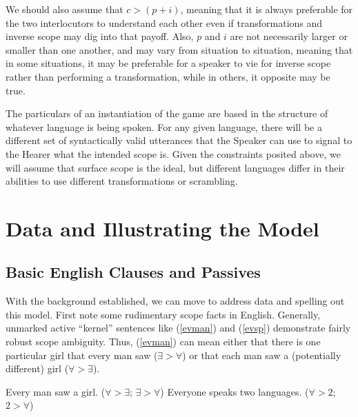 \documentclass{article}
\begin{document}
We should also assume that $c > (p + i)$, meaning that it is always preferable for the two interlocutors to understand each other even if transformations and inverse scope may dig into that payoff.
Also, $p$ and $i$ are not necessarily larger or smaller than one another, and may vary from situation to situation, meaning that in some situations, it may be preferable for a speaker to vie for inverse scope rather than performing a transformation, while in others, it opposite may be true.

The particulars of an instantiation of the game are based in the structure of whatever language is being spoken.
For any given language, there will be a different set of syntactically valid utterances that the Speaker can use to signal to the Hearer what the intended scope is.
Given the constraints posited above, we will assume that surface scope is the ideal, but different languages differ in their abilities to use different transformations or scrambling.


\section{Data and Illustrating the Model}

\subsection{Basic English Clauses and Passives\label{eng}}

With the background established, we can move to address data and spelling out this model.
First note some rudimentary scope facts in English.
Generally, unmarked active ``kernel'' sentences like (\ref{evman}) and (\ref{evsp}) demonstrate fairly robust scope ambiguity.
Thus, (\ref{evman}) can mean either that there is one particular girl that every man saw ($\exists>\forall$) or that each man saw a (potentially different) girl ($\forall>\exists$).

\begin{exe}
\ex\label{first}{\begin{xlist}
\ex Every man saw a girl. \hfill ($\forall > \exists$; $\exists >  \forall$)\label{evman}
\ex Everyone speaks two languages. \hfill ($\forall > 2$; $2 > \forall$)\label{evsp}
\end{xlist}}
\end{exe}
\end{document}

